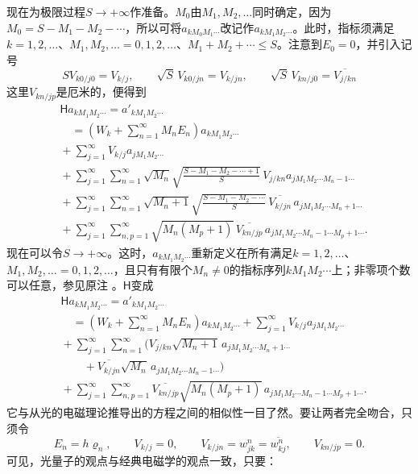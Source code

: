 \documentclass[fontsize=13pt,twoside,openany,headings=normal,parskip=false,bookmarkpackage=false,DIV=calc]{scrbook}
\begin{document}
现在为极限过程$S\longrightarrow+\infty$作准备。$M_0$由$M_1,\allowbreak M_2,\allowbreak \ldots$同时确定，因为$M_0=S-M_1-M_2-\cdots$，所以可将$a_{kM_0M_1\cdots}$改记作$a_{kM_1M_2\cdots}$。此时，指标须满足$k=1,\allowbreak 2,\allowbreak \ldots$、$M_1,\allowbreak M_2,\allowbreak \ldots=0,\allowbreak 1,\allowbreak 2,\allowbreak \ldots$、$M_1+M_2+\cdots\le S$。注意到$E_0=0$，并引入记号
\[
 SV_{k0/j0}=V_{k/j},\qquad \sqrt S\,V_{k0/jn}=V_{k/jn},\qquad
 \sqrt S\,V_{kn/j0}=\overline{V_{j/kn}}
\]
这里$V_{kn/jp}$是厄米的，便得到
\begin{align*}
 &\mathsf{H}a_{kM_1M_2\cdots}=a'_{kM_1M_2\cdots}\\
 &\quad={}\left(W_k+\sum_{n=1}^{\infty}M_nE_n\right)a_{kM_1M_2\cdots}\\
 &{}+\sum_{j=1}^{\infty}V_{k/j}a_{jM_1M_2\cdots}\\
 &{}+\sum_{j=1}^{\infty}\sum_{n=1}^{\infty}\sqrt{M_n}
 \sqrt{\frac{S-M_1-M_2-\cdots+1}{S}}\,V_{j/kn}a_{jM_1M_2\cdots M_n-1\cdots}\\
 &{}+\sum_{j=1}^{\infty}\sum_{n=1}^{\infty}\sqrt{M_n+1}
 \sqrt{\frac{S-M_1-M_2-\cdots}{S}}\,\overline{V_{k/jn}}\,a_{jM_1M_2\cdots M_n+1\cdots}\\
 &{}+\sum_{j=1}^{\infty}\sum_{n,p=1}^{\infty}\sqrt{M_n(M_p+1)}\,
 \overline{V_{kn/jp}}\,a_{jM_1M_2\cdots M_n-1\cdots M_p+1\cdots}.
\end{align*}
现在可以令$S\longrightarrow+\infty$。这时，$a_{kM_1M_2\cdots}$重新定义在所有满足$k=1,\allowbreak 2,\allowbreak \ldots$、$M_1,\allowbreak M_2,\allowbreak \ldots=0,\allowbreak 1,\allowbreak 2,\allowbreak \ldots$，\hypertarget{origpage-150}{}\label{origpage-150}且只有有限个$M_n\ne0$的指标序列$kM_1M_2\cdots$上；非零项个数可以任意，参见原注 \hyperlink{note-144}{}。$\mathsf{H}$变成
\begin{align*}
 &\mathsf{H}a_{kM_1M_2\cdots}=a'_{kM_1M_2\cdots}\\
 &\quad={}\left(W_k+\sum_{n=1}^{\infty}M_nE_n\right)a_{kM_1M_2\cdots}
 +\sum_{j=1}^{\infty}V_{k/j}a_{jM_1M_2\cdots}\\
 &{}+\sum_{j=1}^{\infty}\sum_{n=1}^{\infty}
 \bigl(V_{j/kn}\sqrt{M_n+1}\,a_{jM_1M_2\cdots M_n+1\cdots}\\
 &\qquad{}+\overline{V_{k/jn}}\sqrt{M_n}\,a_{jM_1M_2\cdots M_n-1\cdots}\bigr)\\
 &{}+\sum_{j=1}^{\infty}\sum_{n,p=1}^{\infty}\overline{V_{kn/jp}}\sqrt{M_n(M_p+1)}\,
 a_{jM_1M_2\cdots M_n-1\cdots M_p+1\cdots}.
\end{align*}
它与从光的电磁理论推导出的方程之间的相似性一目了然。要让两者完全吻合，只须令
\[
 E_n=h\varrho_n,\qquad V_{k/j}=0,\qquad V_{k/jn}=w_{jk}^n=\overline{w_{kj}^n},\qquad V_{kn/jp}=0.
\]
可见，光量子的观点与经典电磁学的观点一致，只要：
\end{document}
